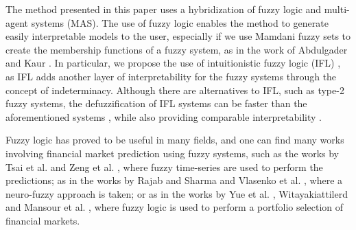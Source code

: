 ﻿\documentclass{ieeeaccess}
\begin{document}
The method presented in this paper uses a hybridization of fuzzy logic
and multi-agent systems (MAS). The use of fuzzy logic enables
the method to generate easily interpretable models to the user,
especially if we use Mamdani fuzzy sets \cite{Mamdani1975} 
to create the membership functions of a fuzzy system, as in the
work of Abdulgader and Kaur \cite{Abdulgader2019}. 
In particular, we propose the use of intuitionistic fuzzy logic (IFL)
\cite{Atanassov1986} \cite{Atanassov2003}, as IFL adds another layer
of interpretability for the fuzzy systems through the concept of
indeterminacy. Although there are alternatives to IFL, such as type-2
fuzzy systems, the defuzzification of IFL systems can be faster than
the aforementioned systems \cite{Hernandez-Aguila2017-2}, while also
providing comparable interpretability \cite{Hernandez-Aguila2016} \cite{castillo2019comments} .

Fuzzy logic has proved to be useful in many fields, and one can find
many works involving financial market prediction using fuzzy systems,
such as the works by Tsai et al. \cite{Tsai2019} and Zeng et
al. \cite{Zeng2019}, where fuzzy time-series are used to perform the
predictions; as in the works by Rajab and Sharma \cite{Rajab2019} and
Vlasenko et al. \cite{Vlasenko2019}, where a neuro-fuzzy approach is
taken; or as in the works by Yue et al. \cite{Yue2019},
Witayakiattilerd \cite{Witayakiattilerd2019} and Mansour et
al. \cite{Mansour2019}, where fuzzy logic is used to perform a
portfolio selection of financial markets.
\end{document}
